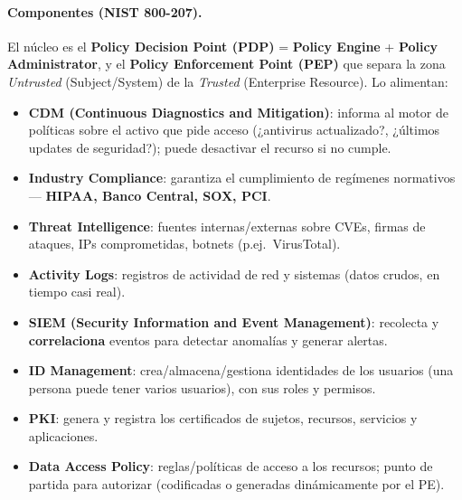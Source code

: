 \documentclass[../main.tex]{subfiles}
\begin{document}
\paragraph{Componentes (NIST 800-207).} El núcleo es el \textbf{Policy Decision
Point (PDP)} = \textbf{Policy Engine} + \textbf{Policy Administrator}, y el
\textbf{Policy Enforcement Point (PEP)} que separa la zona \emph{Untrusted}
(Subject/System) de la \emph{Trusted} (Enterprise Resource). Lo alimentan:
\begin{itemize}
  \item \textbf{CDM (Continuous Diagnostics and Mitigation)}: informa al motor
    de políticas sobre el activo que pide acceso (¿antivirus actualizado?,
    ¿últimos updates de seguridad?); puede desactivar el recurso si no cumple.
  \item \textbf{Industry Compliance}: garantiza el cumplimiento de regímenes
    normativos --- \textbf{HIPAA, Banco Central, SOX, PCI}.
  \item \textbf{Threat Intelligence}: fuentes internas/externas sobre CVEs,
    firmas de ataques, IPs comprometidas, botnets (p.ej.\ VirusTotal).
  \item \textbf{Activity Logs}: registros de actividad de red y sistemas (datos
    crudos, en tiempo casi real).
  \item \textbf{SIEM (Security Information and Event Management)}: recolecta y
    \textbf{correlaciona} eventos para detectar anomalías y generar alertas.
  \item \textbf{ID Management}: crea/almacena/gestiona identidades de los
    usuarios (una persona puede tener varios usuarios), con sus roles y
    permisos.
  \item \textbf{PKI}: genera y registra los certificados de sujetos, recursos,
    servicios y aplicaciones.
  \item \textbf{Data Access Policy}: reglas/políticas de acceso a los recursos;
    punto de partida para autorizar (codificadas o generadas dinámicamente por
    el PE).
\end{itemize}
\end{document}
